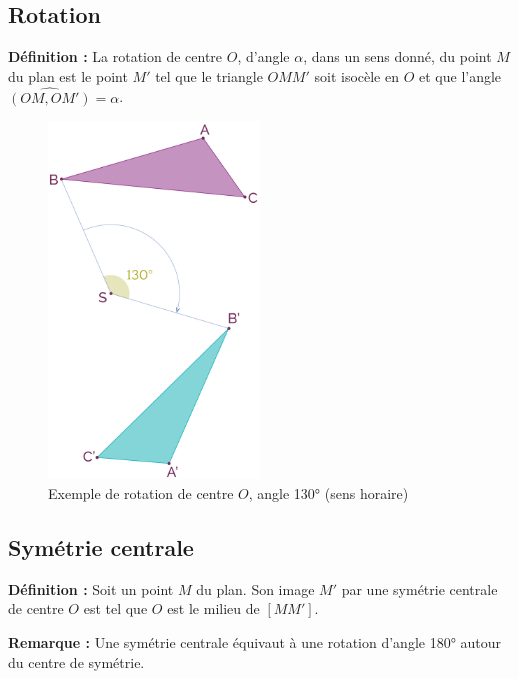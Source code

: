 \documentclass[12pt]{article}
\begin{document}
    \subsection{Rotation}

    \textbf{Définition :} La rotation de centre \( O \), d’angle \( \alpha \), dans un sens donné, du point \( M \) du plan est le point \( M' \) tel que le triangle \( OMM' \) soit isocèle en \( O \) et que l’angle \( \widehat{(OM, OM')} = \alpha \).

    \begin{figure}[H]
        \centering
        \includegraphics[width=0.5\textwidth]{rotation.png}
        \caption{Exemple de rotation de centre \( O \), angle 130° (sens horaire)}
    \end{figure}
    \subsection{Symétrie centrale}

    \textbf{Définition :} Soit un point \( M \) du plan. Son image \( M' \) par une symétrie centrale de centre \( O \) est tel que \( O \) est le milieu de \( [MM'] \).

    \textbf{Remarque :} Une symétrie centrale équivaut à une rotation d’angle 180° autour du centre de symétrie.

\end{document}
